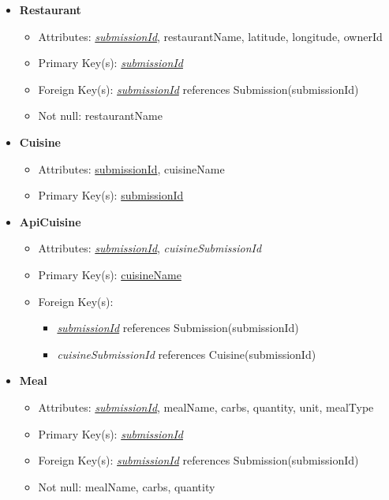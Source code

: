 \begin{itemize}
        \item \textbf{Restaurant}
        \begin{itemize}
            \item Attributes: \underline{\textit{submissionId}}, restaurantName, latitude, longitude, ownerId
            \item Primary Key(s): \underline{\textit{submissionId}}
            \item Foreign Key(s): \underline{\textit{submissionId}} references Submission(submissionId)
            \item Not null: restaurantName
        \end{itemize}
    
        \item \textbf{Cuisine}
        \begin{itemize}
            \item Attributes: \underline{submissionId}, cuisineName
            \item Primary Key(s): \underline{submissionId}        
        \end{itemize}

        \item \textbf{ApiCuisine}
        \begin{itemize}
            \item Attributes: \underline{\textit{submissionId}}, \textit{cuisineSubmissionId}
            \item Primary Key(s): \underline{cuisineName}
            \item Foreign Key(s):
                \begin{itemize}
                    \item \underline{\textit{submissionId}} references Submission(submissionId)
                    \item \textit{cuisineSubmissionId} references Cuisine(submissionId)
                \end{itemize}
        \end{itemize}

        \item \textbf{Meal}
        \begin{itemize}
            \item Attributes: \underline{\textit{submissionId}}, mealName, carbs, quantity, unit, mealType
            \item Primary Key(s): \underline{\textit{submissionId}}
            \item Foreign Key(s): \underline{\textit{submissionId}} references Submission(submissionId)
            \item Not null: mealName, carbs, quantity
        \end{itemize}


\end{itemize}
